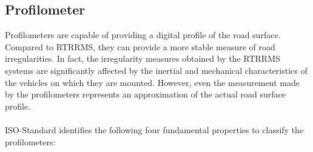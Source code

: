 \documentclass[tesi]{subfiles}
\begin{document}
		\subsection{Profilometer}\label{ssc:profilometers}
\noindent Profilometers are capable of providing a digital profile of the road surface. Compared to RTRRMS, they can provide a more stable measure of road irregularities. In fact, the irregularity measures obtained by the RTRRMS systems are significantly affected by the inertial and mechanical characteristics of the vehicles on which they are mounted. However, even the measurement made by the profilometers represents an approximation of the actual road surface profile\cite{sayers1996interpretation}.\\\\
ISO-Standard\cite{iso_standard} identifies the following four fundamental properties to classify the profilometers:
\end{document}
